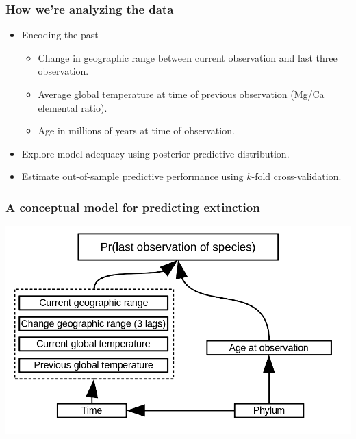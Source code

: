\documentclass{beamer}
\begin{document}
\begin{frame}
  \frametitle{How we're analyzing the data}

  \begin{itemize}%
    \item Encoding the past
      \begin{itemize}
        \item Change in geographic range between current observation and last three observation.
        \item Average global temperature at time of previous observation (Mg/Ca elemental ratio).
        \item Age in millions of years at time of observation.
      \end{itemize}
    \item Explore model adequacy using posterior predictive distribution.
    \item Estimate out-of-sample predictive performance using \(k\)-fold cross-validation.
  \end{itemize}

\end{frame}


\begin{frame}
  \frametitle{A conceptual model for predicting extinction}

  \begin{center}
    \includegraphics[width=\textwidth,height=\textheight,keepaspectratio=true]{figure/conceptual_diagram}
  \end{center}

\end{frame}
\end{document}
